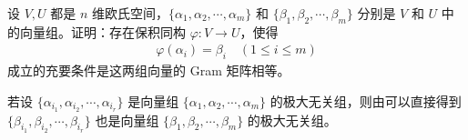 \documentclass[../../main.tex]{subfiles}
\begin{document}
\begin{proposition}\label{proposition:例9.38}
设 \(V,U\) 都是 \(n\) 维欧氏空间，\(\{\alpha_1,\alpha_2,\cdots,\alpha_m\}\) 和 \(\{\beta_1,\beta_2,\cdots,\beta_m\}\) 分别是 \(V\) 和 \(U\) 中的向量组。证明：存在保积同构 \(\varphi:V \to U\)，使得
\begin{align*}
\varphi(\alpha_i) = \beta_i\quad (1\leq i \leq m)
\end{align*}
成立的充要条件是这两组向量的 Gram 矩阵相等。
\end{proposition}
\begin{remark}
若设 \(\{\alpha_{i_1},\alpha_{i_2},\cdots,\alpha_{i_r}\}\) 是向量组 \(\{\alpha_1,\alpha_2,\cdots,\alpha_m\}\) 的极大无关组，则由可以直接得到 \(\{\beta_{i_1},\beta_{i_2},\cdots,\beta_{i_r}\}\) 也是向量组 \(\{\beta_1,\beta_2,\cdots,\beta_m\}\) 的极大无关组。 
\end{remark}
\end{document}
